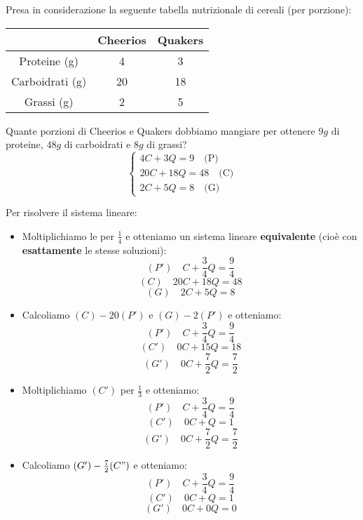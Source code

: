 \documentclass[a4paper]{article}
\theoremstyle{break}
\theoremstyle{break}
\theoremstyle{break}
\theoremstyle{break}
\begin{document}
\begin{example}
	Presa in considerazione la seguente tabella nutrizionale di cereali (per porzione):
	\begin{center}
		\begin{tabular}{c|c|c}
			                & Cheerios & Quakers \\
			\hline
			Proteine (g)    & 4        & 3       \\
			Carboidrati (g) & 20       & 18      \\
			Grassi (g)      & 2        & 5       \\
		\end{tabular}
	\end{center}
	Quante porzioni di Cheerios e Quakers dobbiamo mangiare per ottenere \( 9g \) di
	proteine, \( 48g \) di carboidrati e \( 8g \) di grassi?
	\[
		\begin{cases}
			4C + 3Q = 9 \quad \text{(P)}    \\
			20C + 18Q = 48 \quad \text{(C)} \\
			2C + 5Q = 8 \quad \text{(G)}
		\end{cases}
	\]

	Per risolvere il sistema lineare:
	\begin{itemize}
		\item
		      Moltiplichiamo le per \( \frac{1}{4} \)
		      e otteniamo un sistema lineare \textbf{equivalente} (cioè con
		      \textbf{esattamente} le stesse soluzioni):
		      \[
			      (P') \quad C + \frac{3}{4}Q = \frac{9}{4}
		      \]
		      \[
			      (C) \quad 20C + 18Q = 48
		      \]
		      \[
			      (G) \quad 2C + 5Q = 8
		      \]
		\item Calcoliamo \( (C)-20(P') \) e \( (G)-2(P') \) e otteniamo:
		      \[
			      (P') \quad C + \frac{3}{4}Q = \frac{9}{4}
		      \]
		      \[
			      (C') \quad 0C + 15Q = 18
		      \]
		      \[
			      (G') \quad 0C + \frac{7}{2}Q = \frac{7}{2}
		      \]
		\item Moltiplichiamo \( (C') \) per \( \frac{1}{3} \) e otteniamo:
		      \[
			      (P') \quad C + \frac{3}{4}Q = \frac{9}{4}
		      \]
		      \[
			      (C') \quad 0C + Q = 1
		      \]
		      \[
			      (G') \quad 0C + \frac{7}{2}Q = \frac{7}{2}
		      \]
		\item Calcoliamo \( (G') - \frac{7}{2} (C") \) e otteniamo:
		      \[
			      (P') \quad C + \frac{3}{4}Q = \frac{9}{4}
		      \]
		      \[
			      (C') \quad 0C + Q = 1
		      \]
		      \[
			      (G') \quad 0C + 0Q = 0
		      \]
	\end{itemize}


\end{example}
\end{document}
